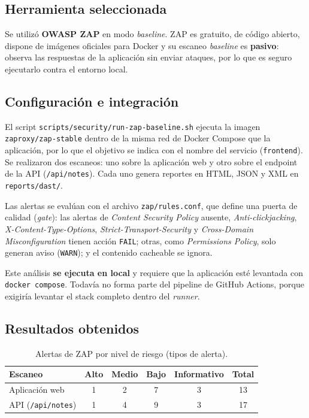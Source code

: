 \subsection{Herramienta seleccionada}

Se utilizó \textbf{OWASP ZAP} en modo \textit{baseline}. ZAP es gratuito, de
código abierto, dispone de imágenes oficiales para Docker y su escaneo
\textit{baseline} es \textbf{pasivo}: observa las respuestas de la aplicación
sin enviar ataques, por lo que es seguro ejecutarlo contra el entorno local.

\subsection{Configuración e integración}

El script \texttt{scripts/security/run-zap-baseline.sh} ejecuta la imagen
\texttt{zaproxy/zap-stable} dentro de la misma red de Docker Compose que la
aplicación, por lo que el objetivo se indica con el nombre del servicio
(\texttt{frontend}). Se realizaron dos escaneos: uno sobre la aplicación web
y otro sobre el endpoint de la API (\texttt{/api/notes}). Cada uno genera
reportes en HTML, JSON y XML en \texttt{reports/dast/}.

{\sloppy
Las alertas se evalúan con el archivo \texttt{zap/rules.conf}, que define
una puerta de calidad (\textit{gate}): las alertas de \textit{Content
Security Policy} ausente, \textit{Anti-clickjacking}, \textit{X-Content-Type-Options},
\textit{Strict-Transport-Security} y \textit{Cross-Domain Misconfiguration}
tienen acción \texttt{FAIL}; otras, como \textit{Permissions Policy}, solo
generan aviso (\texttt{WARN}); y el contenido cacheable se ignora.
\par}

Este análisis \textbf{se ejecuta en local} y requiere que la aplicación esté
levantada con \texttt{docker compose}. Todavía no forma parte del pipeline de
GitHub Actions, porque exigiría levantar el stack completo dentro del
\textit{runner}.

\subsection{Resultados obtenidos}

\begin{table}[H]
\centering
\caption{Alertas de ZAP por nivel de riesgo (tipos de alerta).}
\label{tab:zap-resumen}

\begin{tabularx}{\textwidth}{l c c c c c}
\toprule
\textbf{Escaneo} &
\textbf{Alto} &
\textbf{Medio} &
\textbf{Bajo} &
\textbf{Informativo} &
\textbf{Total} \\
\midrule
Aplicación web & 1 & 2 & 7 & 3 & 13 \\
API (\texttt{/api/notes}) & 1 & 4 & 9 & 3 & 17 \\
\bottomrule
\end{tabularx}
\end{table}

